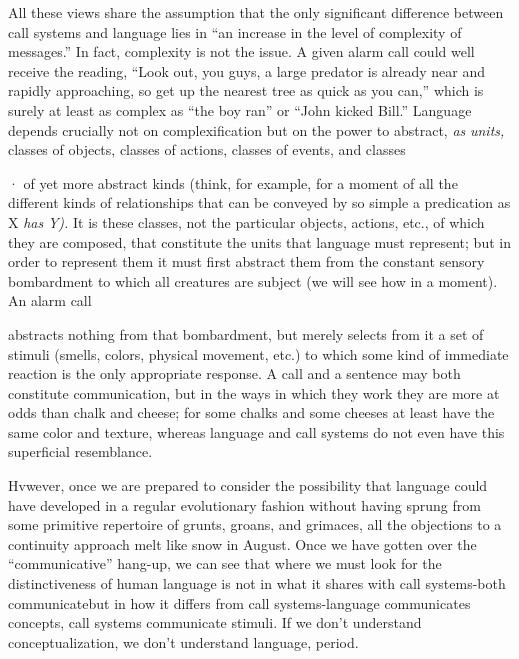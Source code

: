 All these views share the assumption that the only significant difference between call systems and language lies in ``an increase in the level of complexity of messages.'' In fact, complexity is not the issue. A given alarm call could well receive the reading, ``Look out, you guys, a large predator is already near and rapidly approaching, so get up the nearest tree as quick as you can,'' which is surely at least as complex as ``the boy ran'' or ``John kicked Bill.'' Language depends crucially not on complexification but on the power to abstract, \textit{as} \textit{units,} classes of objects, classes of actions, classes of events, and classes

· of yet more abstract kinds (think, for example, for a moment of all the different kinds of relationships that can be conveyed by so simple a predication as X \textit{has} \textit{Y).} It is these classes, not the particular objects, actions, etc., of which they are composed, that constitute the units that language must represent; but in order to represent them it must first abstract them from the constant sensory bombardment to which all creatures are subject (we will see how in a moment). An alarm call


abstracts nothing from that bombardment, but merely selects from it a set of stimuli (smells, colors, physical movement, etc.) to which some kind of immediate reaction is the only appropriate response. A call and a sentence may both constitute communication, but in the ways in which they work they are more at odds than chalk and cheese; for some chalks and some cheeses at least have the same color and texture, whereas language and call systems do not even have this superficial resemblance.

Hvwever, once we are prepared to consider the possibility that language could have developed in a regular evolutionary fashion with\-out having sprung from some primitive repertoire of grunts, groans, and grimaces, all the objections to a continuity approach melt like snow in August. Once we have gotten over the ``communicative'' hang-up, we can see that where we must look for the distinctiveness of human language is not in what it shares with call systems-both communicate\-but in how it differs from call systems-language communicates con\-cepts, call systems communicate stimuli. If we don't understand con\-ceptualization, we don't understand language, period.

